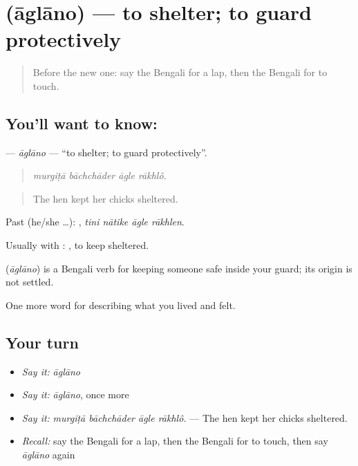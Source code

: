 \section[\texorpdfstring{\bn{আগলানো} (āglāno)}{আগলানো (āglāno)}]{ (āglāno) — to shelter; to guard protectively}

\label{lesson:BN-C487-aglano}



\begin{quote}
Before the new one: say the Bengali for a lap, then the Bengali for to touch.
\end{quote}

\subsection*{You'll want to know: }
\textbf{} — \emph{āglāno} — \textquotedblleft{}to shelter; to guard protectively\textquotedblright{}.

\begin{quote}
   
\end{quote}

\begin{quote}
\emph{murgiṭā bāchchāder āgle rākhlô.}
\end{quote}

\begin{quote}
The hen kept her chicks sheltered.
\end{quote}

Past (he/she …):    , \emph{tini nātike āgle rākhlen}.

Usually with :  , to keep sheltered.

\begin{cousinweb}
\textbf{} (\emph{āglāno}) is a Bengali verb for keeping someone safe inside your guard; its origin is not settled.
\end{cousinweb}

\begin{grammarlens}[title={What you've built}]
One more word for describing what you lived and felt.
\end{grammarlens}

\subsection*{Your turn}
\begin{itemize}
\raggedright
  \item \emph{Say it:} \emph{āglāno}
  \item \emph{Say it:} \emph{āglāno}, once more
  \item \emph{Say it:} \emph{murgiṭā bāchchāder āgle rākhlô.} — The hen kept her chicks sheltered.
  \item \emph{Recall:} say the Bengali for a lap, then the Bengali for to touch, then say \emph{āglāno} again
\end{itemize}

